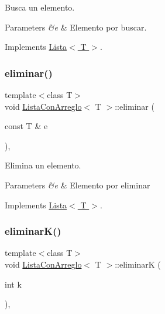 Busca un elemento. 


\begin{DoxyParams}{Parameters}
{\em \&e} & Elemento por buscar. \\
\hline
\end{DoxyParams}


Implements \hyperlink{class_lista}{Lista$<$ T $>$}.

\hypertarget{class_lista_con_arreglo_a0ee68c7b0f66324764bacd4ee4ffab50}{}\label{class_lista_con_arreglo_a0ee68c7b0f66324764bacd4ee4ffab50} 
\subsubsection{\texorpdfstring{eliminar()}{eliminar()}}
{\ttfamily template$<$class T$>$ \\
void \hyperlink{class_lista_con_arreglo}{Lista\+Con\+Arreglo}$<$ T $>$\+::eliminar (\begin{DoxyParamCaption}\item[{const T \&}]{e }\end{DoxyParamCaption})\hspace{0.3cm}{\ttfamily [inline]}, {\ttfamily [virtual]}}



Elimina un elemento. 


\begin{DoxyParams}{Parameters}
{\em \&e} & Elemento por eliminar \\
\hline
\end{DoxyParams}


Implements \hyperlink{class_lista}{Lista$<$ T $>$}.

\hypertarget{class_lista_con_arreglo_acd8b8f484dc440dc64dc58cad375e7e4}{}\label{class_lista_con_arreglo_acd8b8f484dc440dc64dc58cad375e7e4} 
\subsubsection{\texorpdfstring{eliminar\+K()}{eliminarK()}}
{\ttfamily template$<$class T$>$ \\
void \hyperlink{class_lista_con_arreglo}{Lista\+Con\+Arreglo}$<$ T $>$\+::eliminarK (\begin{DoxyParamCaption}\item[{int}]{k }\end{DoxyParamCaption})\hspace{0.3cm}{\ttfamily [inline]}, {\ttfamily [virtual]}}



